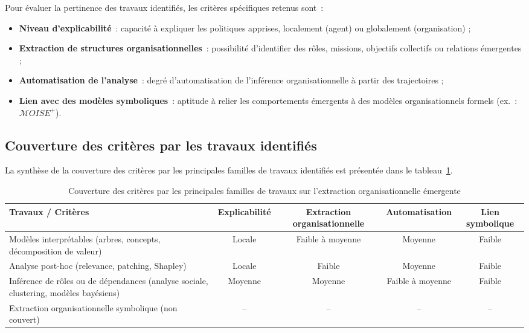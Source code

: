 Pour évaluer la pertinence des travaux identifiés, les critères spécifiques retenus sont~:
\begin{itemize}
  \item \textbf{Niveau d’explicabilité}~: capacité à expliquer les politiques apprises, localement (agent) ou globalement (organisation) ;
  \item \textbf{Extraction de structures organisationnelles}~: possibilité d’identifier des rôles, missions, objectifs collectifs ou relations émergentes ;
  \item \textbf{Automatisation de l’analyse}~: degré d’automatisation de l’inférence organisationnelle à partir des trajectoires ;
  \item \textbf{Lien avec des modèles symboliques}~: aptitude à relier les comportements émergents à des modèles organisationnels formels (ex.~: $\mathcal{M}OISE^+$).
\end{itemize}

\subsection*{Couverture des critères par les travaux identifiés}

La synthèse de la couverture des critères par les principales familles de travaux identifiés est présentée dans le tableau~\ref{tab:couverture_criteres_travaux_anl}.

\begin{table}[h!]
  \centering
  \caption{Couverture des critères par les principales familles de travaux sur l’extraction organisationnelle émergente}
  \label{tab:couverture_criteres_travaux_anl}
  \begin{tabular}{|p{5cm}|c|c|c|c|}
    \hline
    \textbf{Travaux / Critères}                                                           & \textbf{Explicabilité} & \textbf{Extraction organisationnelle} & \textbf{Automatisation} & \textbf{Lien symbolique} \\
    \hline
    Modèles interprétables (arbres, concepts, décomposition de valeur)                    & Locale                 & Faible à moyenne                      & Moyenne                 & Faible                   \\
    \hline
    Analyse post-hoc (relevance, patching, Shapley)                                       & Locale                 & Faible                                & Moyenne                 & Faible                   \\
    \hline
    Inférence de rôles ou de dépendances (analyse sociale, clustering, modèles bayésiens) & Moyenne                & Moyenne                               & Faible à moyenne        & Faible                   \\
    \hline
    Extraction organisationnelle symbolique (non couvert)                                 & --                     & --                                    & --                      & --                       \\
    \hline
  \end{tabular}
\end{table}

